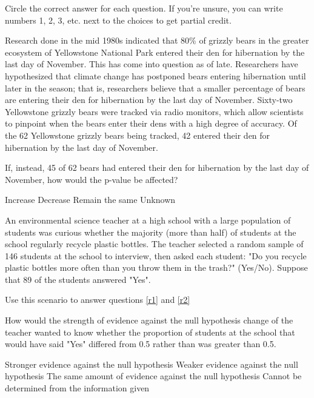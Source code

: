 \documentclass{article}
\begin{document}
	Circle the correct answer for each question.  If you're unsure, you can write numbers 1, 2, 3, etc. next to the choices to get partial credit.\\[.5cm]
	\begin{mcquestions}
		\question \question Research done in the mid 1980s indicated that 80\% of grizzly bears in the greater ecosystem of Yellowstone National Park entered their den for hibernation by the last day of November. This has come into question as of late. Researchers have hypothesized that climate change has postponed bears entering hibernation until later in the season; that is, researchers believe that a smaller percentage of bears are entering their den for hibernation by the last day of November. 
		Sixty-two Yellowstone grizzly bears were tracked via radio monitors, which allow scientists to pinpoint when the bears enter their dens with a high degree of accuracy. Of the 62 Yellowstone grizzly bears being tracked, 42 entered their den for hibernation by the last day of November.
		
		If, instead, 45 of 62 bears had entered their den for hibernation by the last day of November, how would the p-value be affected?
		
		\begin{mcanswerslist}
			\answer[correct] Increase
			\answer Decrease
			\answer Remain the same
			\answer Unknown
		\end{mcanswerslist}
		
		\begin{mcquestioninstruction}
			An environmental science teacher at a high school with a large population of students was curious whether the majority (more than half) of students at the school regularly recycle plastic bottles. The teacher selected a random sample of 146 students at the school to interview, then asked each student: "Do you recycle plastic bottles more often than you throw them in the trash?" (Yes/No). Suppose that 89 of the students answered "Yes".
		
			Use this scenario to answer questions \ref{r1} and \ref{r2}
		\end{mcquestioninstruction}
		
		\question  How would the strength of evidence against the null hypothesis change of the teacher wanted to know whether the proportion of students at the school that would have said "Yes" differed from 0.5 rather than was greater than 0.5.\label{r1}
		
		
		\begin{mcanswerslist}
		\answer Stronger evidence against the null hypothesis
		\answer[correct] Weaker evidence against the null hypothesis
		\answer The same amount of evidence against the null hypothesis
		\answer Cannot be determined from the information given
		\end{mcanswerslist}
		

\end{mcquestions}
\end{document}
